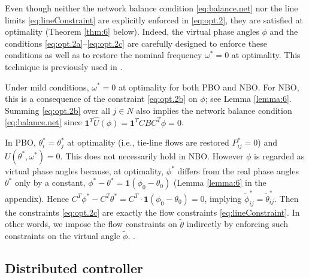 Even though neither the network balance condition \eqref{eq:balance.net} nor the
line limits \eqref{eq:lineConstraint} are explicitly enforced in \eqref{eq:opt.2}, 
they are satisfied at optimality (Theorem \ref{thm:6} below).
Indeed, the virtual phase angles $\phi$  
and the conditions \eqref{eq:opt.2a}--\eqref{eq:opt.2c} are carefully designed to
enforce these conditions as well as to restore the nominal frequency $\omega^*=0$
at optimality.  This technique is previously used in \cite{Mallada-2017-OLC-TAC}.
\begin{remark}
\bee
        \item
        Under mild conditions, $\omega^*=0$ at optimality for both PBO and NBO.  
        For NBO, this is a consequence of the constraint \eqref{eq:opt.2b} on $\phi$; 
        see Lemma \ref{lemma:6}.
        Summing \eqref{eq:opt.2b} over 
        all $j\in N$ also implies the network  balance condition \eqref{eq:balance.net}
        since $\textbf{1}^T \hat U(\phi) = \textbf{1}^T CBC^T\phi = 0$.

        \item
        In PBO, $\theta^*_i = \theta^*_j$ at optimality (i.e., tie-line flows are restored
        $P_{ij}^*=0$) and $U(\theta^*, \omega^*)=0$.  This does not necessarily hold in NBO.  
        However $\phi$ is regarded as virtual phase angles because, at optimality, 
        $\phi^*$ differs from the real phase angles $\theta^*$ only by a constant, 
        $\phi^*-\theta^*=\textbf{1}(\phi_0-\theta_0)$ (Lemma \ref{lemma:6} in
        the appendix).
        Hence $C^T\phi^*-C^T\theta^*=C^T\cdot\textbf{1}(\phi_0-\theta_0)=0$,  implying 
        $\tilde\phi_{ij}^*=\tilde\theta_{ij}^*$. 
        Then the constraints \eqref{eq:opt.2c} are exactly the flow constraints \eqref{eq:lineConstraint}.
        In other words, we impose the flow constraints on $\tilde{\theta}$ indirectly by enforcing such
        constraints on the virtual angle  $\tilde{\phi}$.  .
\eee
\end{remark}



\subsection{Distributed controller}

